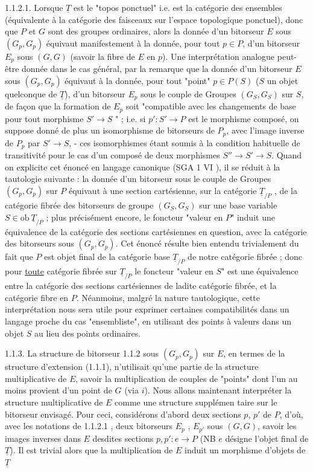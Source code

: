 1.1.2.1.  Lorsque $\underline{T}$ est le "topos ponctuel" i.e. est la catégorie des ensembles (équivalente à la catégorie des faisceaux sur l'espace topologique ponctuel), donc que $P$ et $G$ sont des groupes ordinaires, alors la donnée d'un bitorseur $E$ sous  $(G_p,G_p)$  équivaut manifestement à la donnée, pour tout $p \in P$, d'un bitorseur $E_p$ sous $(G,G)$ (savoir la fibre de $E$ en $p$). Une interprétation analogue peut-être donnée dans le cas général, par la remarque que la donnée d'un bitorseur $E$ sous $(G_p,G_p)$ équivaut à la donnée, pour tout "point" $p \in P(S)$ ($S$ un objet quelconque de $\underline{T}$), d'un bitorseur $E_p$ sous
le couple de Groupes $(G_S,G_S)$ sur $S$, de façon que la formation de $E_p$ soit "compatible avec les changements de base pour tout morphisme $S' \longrightarrow S$ " ; i.e. si $p' : S' \longrightarrow P$ est le morphisme composé, on suppose donné de plus un isomorphisme de bitorseurs de $P_p$, avec l'image inverse de $P_p$ par $S' \longrightarrow S$, - ces isomorphismes étant soumis à la condition habituelle de transitivité pour le cas d'un composé de deux morphismes $S'' \longrightarrow S' \longrightarrow S$. Quand on explicite cet énoncé en langage canonique (SGA 1 VI    ), il se réduit à la tautologie suivante : la donnée d'un bitorseur sous le couple de Groupes $(G_p,G_p)$ sur $P$ équivaut à une section cartésienne, sur la catégorie $\underline{T}_{/P}$ , de la catégorie fibrée des bitorseurs de groupe $(G_S,G_S)$ sur une base variable $S \in \mathrm{ob}\ \underline{T}_{/P}$ ; plus précisément encore, le foncteur "valeur en $P$" induit une équivalence de la catégorie des sections cartésiennes en question, avec la catégorie des bitorseurs sous $(G_p,G_p)$. Cet énoncé résulte bien entendu trivialement du fait que $P$ est objet final de la catégorie base $\underline{T}_{/P}$ de notre catégorie fibrée ; donc pour \underline{toute} catégorie fibrée sur $\underline{T}_{/P}$ le foncteur "valeur en $S$" est une équivalence entre la catégorie des sections cartésiennes de ladite catégorie fibrée, et la catégorie fibre en $P$. Néanmoins, malgré la nature tautologique, cette interprétation nous sera utile pour exprimer certaines compatibilités dans un langage proche du cas "ensembliste", en utilisant des points à valeurs dans un objet $S$ au lieu des points ordinaires.

1.1.3.  La structure de bitorseur 1.1.2 sous $(G_p,G_p)$ sur $E$, en termes de la structure d'extension (1.1.1), n'utilisait qu'une partie de la structure multiplicative de $E$, savoir la multiplication de couples de "points" dont l'un au moins provient d'un point de $G$ (via $i$). Nous allons maintenant interpréter la structure multiplicative de $E$ comme une structure supplémen
taire sur le bitorseur envisagé. Pour ceci, considérons d'abord deux sections $p$, $p'$ de $P$, d'où, avec les notations de 1.1.2.1 , deux bitorseurs $E_p$ , $E_{p'}$ sous $(G,G)$, savoir les images inverses dans $E$ desdites sections $p,p' : e \longrightarrow P$ (NB $e$ désigne l'objet final de $\underline{T}$). Il est trivial alors que la multiplication de $E$ induit un morphisme d'objets de $\underline{T}$

